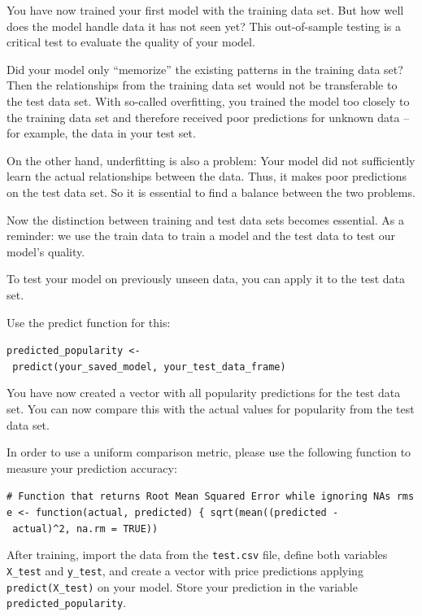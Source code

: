 \documentclass[
  11pt,
]{book}
\newenvironment{tips}[1]
  {
  \begin{itemize}
  \footnotesize
  \renewcommand{\labelitemi}{
    \raisebox{-.7\height}[0pt][0pt]{
      {\setkeys{Gin}{width=3em,keepaspectratio}
        \texttt{[image: images/\#1.png]}}
    }
  }
  \setlength{\fboxsep}{1em}
  \begin{rbox}
  \item
  }
  {
  \end{rbox}
  \end{itemize}
  }
\begin{document}
You have now trained your first model with the training data set. But how well does the model handle data it has not seen yet? This out-of-sample testing is a critical test to evaluate the quality of your model.

Did your model only ``memorize'' the existing patterns in the training data set? Then the relationships from the training data set would not be transferable to the test data set. With so-called overfitting, you trained the model too closely to the training data set and therefore received poor predictions for unknown data -- for example, the data in your test set.

On the other hand, underfitting is also a problem: Your model did not sufficiently learn the actual relationships between the data. Thus, it makes poor predictions on the test data set. So it is essential to find a balance between the two problems.

Now the distinction between training and test data sets becomes essential. As a reminder: we use the train data to train a model and the test data to test our model's quality.

To test your model on previously unseen data, you can apply it to the test data set.

\begin{tips}r

Use the predict function for this:

\texttt{predicted\_popularity\ \textless{}-\ predict(your\_saved\_model,\ your\_test\_data\_frame)}

You have now created a vector with all popularity predictions for the test data set. You can now compare this with the actual values for popularity from the test data set.

In order to use a uniform comparison metric, please use the following function to measure your prediction accuracy:

\texttt{\#\ Function\ that\ returns\ Root\ Mean\ Squared\ Error\ while\ ignoring\ NAs\ rmse\ \textless{}-\ function(actual,\ predicted)\ \{\ sqrt(mean((predicted\ -\ actual)\^{}2,\ na.rm\ =\ TRUE))}

After training, import the data from the \texttt{test.csv} file, define both variables \texttt{X\_test} and \texttt{y\_test}, and create a vector with price predictions applying \texttt{predict(X\_test)} on your model. Store your prediction in the variable \texttt{predicted\_popularity}.

\end{tips}
\end{document}
